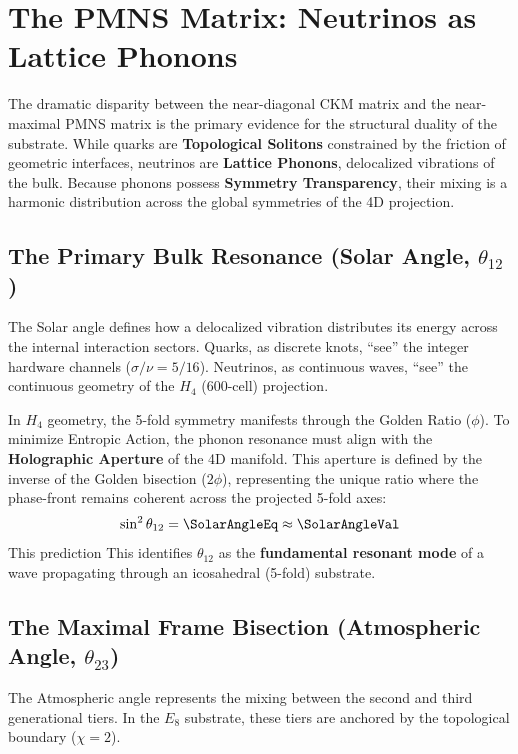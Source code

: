 \section{The PMNS Matrix: Neutrinos as Lattice Phonons}

The dramatic disparity between the near-diagonal CKM matrix and the near-maximal PMNS matrix is the primary evidence for the structural duality of the substrate. While quarks are \textbf{Topological Solitons} constrained by the friction of geometric interfaces, neutrinos are \textbf{Lattice Phonons}, delocalized vibrations of the bulk. Because phonons possess \textbf{Symmetry Transparency}, their mixing is a harmonic distribution across the global symmetries of the 4D projection.

\subsection{The Primary Bulk Resonance (Solar Angle, \texorpdfstring{$\theta_{12}$}{theta 12})}
The Solar angle defines how a delocalized vibration distributes its energy across the internal interaction sectors. Quarks, as discrete knots, ``see'' the integer hardware channels ($\sigma/\nu = 5/16$). Neutrinos, as continuous waves, ``see'' the continuous geometry of the $H_4$ (600-cell) projection.

In $H_4$ geometry, the 5-fold symmetry manifests through the Golden Ratio ($\phi$). To minimize Entropic Action, the phonon resonance must align with the \textbf{Holographic Aperture} of the 4D manifold. This aperture is defined by the inverse of the Golden bisection ($2\phi$), representing the unique ratio where the phase-front remains coherent across the projected 5-fold axes:
\begin{equation}
    \sin^2 \theta_{12} = \SolarAngleEq \approx \mathbf{\SolarAngleVal}
\end{equation}
This prediction \SolarAngleAccText This identifies $\theta_{12}$ as the \textbf{fundamental resonant mode} of a wave propagating through an icosahedral (5-fold) substrate.

\subsection{The Maximal Frame Bisection (Atmospheric Angle, \texorpdfstring{$\theta_{23}$}{theta 23})}

The Atmospheric angle represents the mixing between the second and third generational tiers. In the $E_8$ substrate, these tiers are anchored by the topological boundary ($\chi=2$). 

